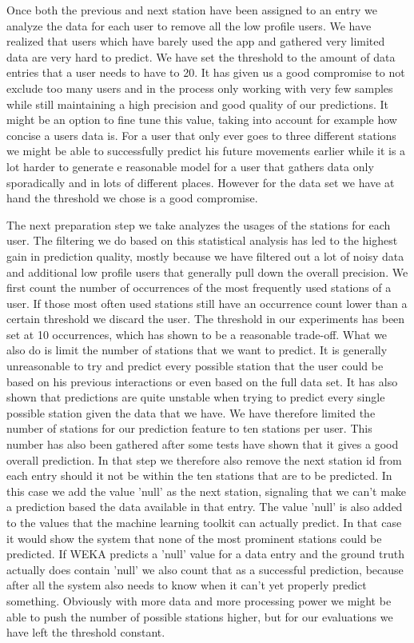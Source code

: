 Once both the previous and next station have been assigned to an entry we analyze the data for each user to remove all the low profile users. We have realized that users which have barely used the app and gathered very limited data are very hard to predict. We have set the threshold to the amount of data entries that a user needs to have to 20. It has given us a good compromise to not exclude too many users and in the process only working with very few samples while still maintaining a high precision and good quality of our predictions. It might be an option to fine tune this value, taking into account for example how concise a users data is. For a user that only ever goes to three different stations we might be able to successfully predict his future movements earlier while it is a lot harder to generate e reasonable model for a user that gathers data only sporadically and in lots of different places. However for the data set we have at hand the threshold we chose is a good compromise.

\label{subsubsec:station_usage}
The next preparation step we take analyzes the usages of the stations for each user. The filtering we do based on this statistical analysis has led to the highest gain in prediction quality, mostly because we have filtered out a lot of noisy data and additional low profile users that generally pull down the overall precision. We first count the number of occurrences of the most frequently used stations of a user. If those most often used stations still have an occurrence count lower than a certain threshold we discard the user. The threshold in our experiments has been set at 10 occurrences, which has shown to be a reasonable trade-off. 
What we also do is limit the number of stations that we want to predict. It is generally unreasonable to try and predict every possible station that the user could be based on his previous interactions or even based on the full data set. It has also shown that predictions are quite unstable when trying to predict every single possible station given the data that we have. We have therefore limited the number of stations for our prediction feature to ten stations per user. This number has also been gathered after some tests have shown that it gives a good overall prediction. In that step we therefore also remove the next station id from each entry should it not be within the ten stations that are to be predicted. In this case we add the value 'null' as the next station, signaling that we can't make a prediction based the data available in that entry. The value 'null' is also added to the values that the machine learning toolkit can actually predict. In that case it would show the system that none of the most prominent stations could be predicted. If WEKA predicts a 'null' value for a data entry and the ground truth actually does contain 'null' we also count that as a successful prediction, because after all the system also needs to know when it can't yet properly predict something. Obviously with more data and more processing power we might be able to push the number of possible stations higher, but for our evaluations we have left the threshold constant.

